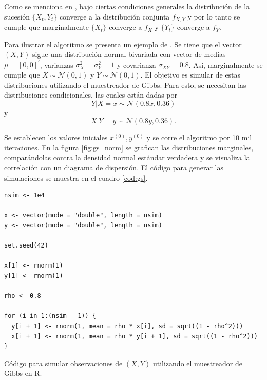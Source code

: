 \documentclass[11pt,a4paper]{article}
\begin{document}
Como se menciona en \citet{casella_gs}, bajo ciertas condiciones generales la distribución de la sucesión $\lbrace X_t, Y_t \rbrace$ converge a la distribución conjunta $f_{X, Y}$ y por lo tanto se cumple que marginalmente $\lbrace X_t \rbrace$ converge a $f_X$ y $\lbrace Y_t \rbrace$ converge a $f_Y$.

Para ilustrar el algoritmo se presenta un ejemplo de \citet{casella}. Se tiene que el vector $(X, Y)$ sigue una distribución normal bivariada con vector de medias $\mu = [0, 0]^\prime$, varianzas $\sigma^2_X = \sigma^2_Y = 1$ y covarianza $\sigma_{XY} = 0.8$. Así, marginalmente se cumple que $X \sim \mathcal{N}(0, 1)$ y $Y \sim \mathcal{N}(0, 1)$. El objetivo es simular de estas distribuciones utilizando el muestreador de Gibbs. Para esto, se necesitan las distribuciones condicionales, las cuales están dadas por $$Y|X = x \sim \mathcal{N}(0.8 x, 0.36)$$ y $$X|Y = y \sim \mathcal{N}(0.8 y, 0.36).$$

Se establecen los valores iniciales $x^{(0)}, y^{(0)}$ y se corre el algoritmo por 10 mil iteraciones. En la figura \ref{fig:gs_norm} se grafican las distribuciones marginales, comparándolas contra la densidad normal estándar verdadera y se visualiza la correlación con un diagrama de dispersión. El código para generar las simulaciones se muestra en el cuadro \ref{cod:gs}.

\begin{table}[htb]
\begin{lstlisting}
nsim <- 1e4

x <- vector(mode = "double", length = nsim)
y <- vector(mode = "double", length = nsim)

set.seed(42)

x[1] <- rnorm(1)
y[1] <- rnorm(1)

rho <- 0.8

for (i in 1:(nsim - 1)) {
  y[i + 1] <- rnorm(1, mean = rho * x[i], sd = sqrt((1 - rho^2)))
  x[i + 1] <- rnorm(1, mean = rho * y[i + 1], sd = sqrt((1 - rho^2)))
}
\end{lstlisting}
\caption{Código para simular observaciones de $(X, Y)$ utilizando el muestreador de Gibbs en R. }
\label{cod:gs}
\end{table}
\end{document}
